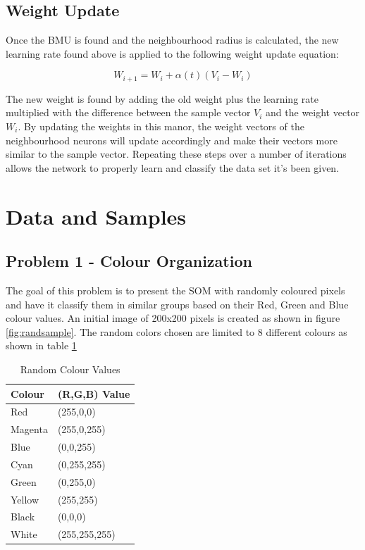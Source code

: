\documentclass{IEEEtran}
\begin{document}
\subsection{Weight Update}
Once the BMU is found and the neighbourhood radius is calculated, the new learning rate found above is applied to the following weight update equation:

\begin{equation}
W_{i+1} = W_{i} + \alpha(t)(V_{i} - W_{i})
\label{eqn:weightupdate}
\end{equation}

The new weight is found by adding the old weight plus the learning rate multiplied with the difference between the sample vector $V_{i}$ and the weight vector $W_{i}$. By updating the weights in this manor, the weight vectors of the neighbourhood neurons will update accordingly and make their vectors more similar to the sample vector. Repeating these steps over a number of iterations allows the network to properly learn and classify the data set it's been given. 

\section{Data and Samples}
\subsection{Problem 1 - Colour Organization}
The goal of this problem is to present the SOM with randomly coloured pixels and have it classify them in similar groups based on their Red, Green and Blue colour values. An initial image of 200x200 pixels is created as shown in figure \ref{fig:randsample}. The random colors chosen are limited to 8 different colours as shown in table  \ref{tab:colordata}

{\renewcommand{\arraystretch}{2}%
\begin{table}[!htbp]
\caption {Random Colour Values} \small
\centering
\begin{tabular}{|l|l|}
\hline
Colour & (R,G,B) Value\\
\hline
Red & (255,0,0) \\
\hline
Magenta & (255,0,255) \\
\hline
Blue & (0,0,255) \\
\hline
Cyan & (0,255,255) \\
\hline
Green & (0,255,0) \\
\hline
Yellow & (255,255) \\
\hline
Black & (0,0,0) \\
\hline
White & (255,255,255)\\
\hline
\end{tabular}
\label{tab:colordata}
\end{table}
}
\end{document}
